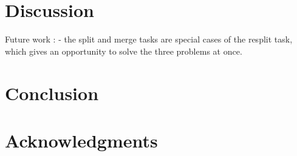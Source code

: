 \documentclass[conference]{IEEEtran}
\begin{document}
\section{Discussion}

Future work :
- the split and merge tasks
are special cases of the resplit task, which gives an opportunity to solve
the three problems at once.

\section{Conclusion}

\section{Acknowledgments}



\end{document}
